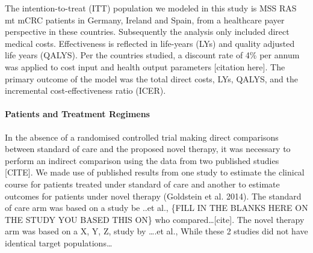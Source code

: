 \documentclass[
]{article}
\begin{document}
The intention-to-treat (ITT) population we modeled in this study is MSS
RAS mt mCRC patients in Germany, Ireland and Spain, from a healthcare
payer perspective in these countries. Subsequently the analysis only
included direct medical costs. Effectiveness is reflected in life-years
(LYs) and quality adjusted life years (QALYS). Per the countries
studied, a discount rate of 4\% per annum was applied to cost input and
health output parameters {[}citation here{]}. The primary outcome of the
model was the total direct costs, LYs, QALYS, and the incremental
cost-effectiveness ratio (ICER).

\hypertarget{patients-and-treatment-regimens}{%
\paragraph{Patients and Treatment
Regimens}\label{patients-and-treatment-regimens}}

In the absence of a randomised controlled trial making direct
comparisons between standard of care and the proposed novel therapy, it
was necessary to perform an indirect comparison using the data from two
published studies {[}CITE{]}. We made use of published results from one
study to estimate the clinical course for patients treated under
standard of care and another to estimate outcomes for patients under
novel therapy (Goldstein et al. 2014). The standard of care arm was
based on a study be ..et al., \{FILL IN THE BLANKS HERE ON THE STUDY YOU
BASED THIS ON\} who compared\ldots{[}cite{]}. The novel therapy arm was
based on a X, Y, Z, study by \ldots.et al., While these 2 studies did
not have identical target populations\ldots{}
\end{document}
